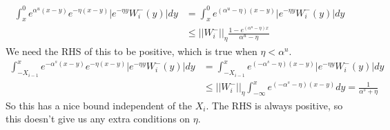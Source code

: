 \documentclass[12pt]{article}
\begin{document}
\begin{align*}
\int_x^0 e^{\alpha^u (x-y)}e^{-\eta(x-y)}|e^{-\eta y} W_i^-(y)| dy &= \int_x^0 e^{(\alpha^u - \eta) (x-y)}|e^{-\eta y} W_i^-(y)| dy \\
&\leq ||W_i^-||_\eta \frac{1 - e^{(\alpha^u - \eta)x}}{\alpha^u - \eta}
\end{align*}
We need the RHS of this to be positive, which is true when $\eta < \alpha^u$.\\

\begin{align*}
\int_{-X_{i-1}}^x e^{-\alpha^s (x-y)}e^{-\eta(x-y)}|e^{-\eta y} W_i^-(y)| dy &= \int_{-X_{i-1}}^x e^{(-\alpha^s - \eta) (x-y)}|e^{-\eta y} W_i^-(y)| dy \\
&\leq ||W_i^-||_\eta \int_{-\infty}^x e^{(-\alpha^s - \eta) (x-y)} dy = \frac{1}{\alpha^s + \eta}
\end{align*}
So this has a nice bound independent of the $X_i$. The RHS is always positive, so this doesn't give us any extra conditions on $\eta$.
\end{document}
